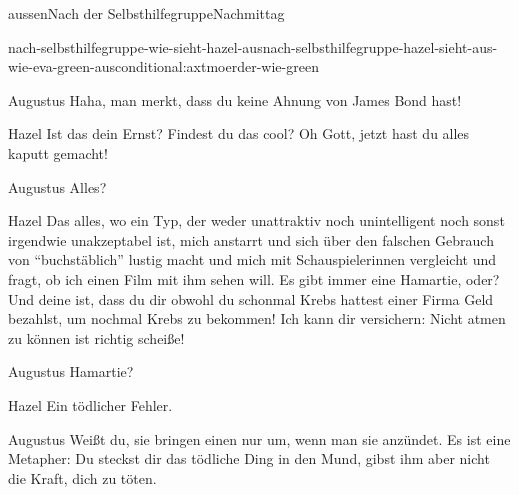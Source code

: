 \documentclass[12pt]{article}
\begin{document}
\begin{scene}[cut to]{aussen}{Nach der Selbsthilfegruppe}{Nachmittag}
\begin{conditional}{nach-selbsthilfegruppe-wie-sieht-hazel-aus}{nach-selbsthilfegruppe-hazel-sieht-aus-wie-eva-green-aus}{conditional:axtmoerder-wie-green}
            \begin{dialog}{Augustus}
                Haha, man merkt, dass du keine Ahnung von James Bond hast! 
            \end{dialog}
        \end{conditional}


        \begin{dialog}[entsetzt]{Hazel}
            Ist das dein Ernst?
            Findest du das cool?
            Oh Gott, jetzt hast du alles kaputt gemacht!
        \end{dialog}

        \begin{dialog}{Augustus}
            Alles?
        \end{dialog}

        \begin{dialog}{Hazel}
            Das alles, wo ein Typ, der weder unattraktiv noch unintelligent noch sonst irgendwie unakzeptabel ist, mich anstarrt und sich über den falschen Gebrauch von ``buchstäblich'' lustig macht und mich mit Schauspielerinnen vergleicht und fragt, ob ich einen Film mit ihm sehen will.
            Es gibt immer eine Hamartie, oder?
            Und deine ist, dass du dir  obwohl du schonmal Krebs hattest einer Firma Geld bezahlst, um nochmal Krebs zu bekommen!
            Ich kann dir versichern:
            Nicht atmen zu können ist richtig scheiße!
        \end{dialog}

        \begin{dialog}{Augustus}
            Hamartie?
        \end{dialog}

        \begin{dialog}{Hazel}
            Ein tödlicher Fehler.
        \end{dialog}


        \begin{dialog}[lächelnd]{Augustus}
            Weißt du, sie bringen einen nur um, wenn man sie anzündet.
            Es ist eine Metapher: Du steckst dir das tödliche Ding in den Mund, gibst ihm aber nicht die Kraft, dich zu töten.
        \end{dialog}


\end{scene}
\end{document}
